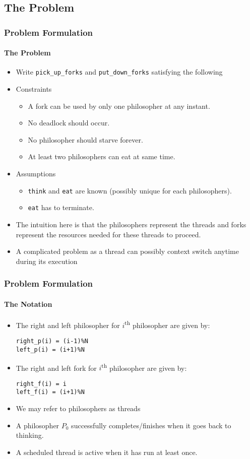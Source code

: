 \documentclass[aspectratio=169, handout, 10pt]{beamer}
\theoremstyle{example}
\begin{document}
\subsection{The Problem}
\begin{frame}[fragile]\frametitle{Problem Formulation}\framesubtitle{The Problem}
  \begin{itemize}
  \pause\item Write \verb!pick_up_forks! and \verb!put_down_forks! satisfying the following
  \pause\item  Constraints
  \begin{itemize}
      \pause\item A fork can be used by only one philosopher at any instant.
      \pause\item No deadlock should occur.
      \pause\item No philosopher should starve forever.
      \pause\item At least two philosophers can eat at same time.
  \end{itemize}
  \pause\item Assumptions
  \begin{itemize}
      \pause\item \verb!think! and \verb!eat! are known (possibly unique for each philosophers).
      \pause\item \verb!eat! has to terminate.
  \end{itemize}
  \pause\item The intuition here is that the philosophers represent the threads and forks represent the resources needed for these threads to proceed.
  \pause\item A complicated problem as a thread can possibly context switch anytime during its execution%
  \end{itemize}
\end{frame}
\begin{frame}[fragile]\frametitle{Problem Formulation}\framesubtitle{The Notation}
  \begin{itemize}
\pause\item The right and left philosopher for $i$\textsuperscript{th} philosopher are given by:
  \begin{Verbatim}[frame=single]
right_p(i) = (i-1)%N
left_p(i) = (i+1)%N
\end{Verbatim}
\pause\item The right and left fork for $i$\textsuperscript{th} philosopher are given by:
  \begin{Verbatim}[frame=single]
right_f(i) = i
left_f(i) = (i+1)%N
\end{Verbatim}
\pause\item We may refer to philosophers as threads
\pause\item A philosopher $P_0$ successfully completes/finishes when it goes back to thinking. %
\pause\item A scheduled thread is active when it has run at least once.
  \end{itemize}
\end{frame}
\end{document}
